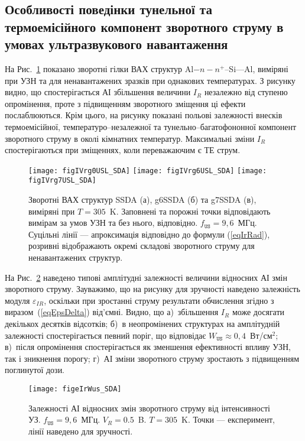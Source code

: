 \subsection{Особливості поведінки тунельної та термоемісійного компонент зворотного струму в умовах ультразвукового навантаження}

На Рис.~\ref{figIVrg0USL_SDA} показано зворотні гілки ВАХ структур Al$-n-n^+$--Si---Al, виміряні при УЗН та для ненавантажених
зразків при однакових температурах.
З рисунку видно, що спостерігається АІ збільшення величини $I_R$ незалежно від ступеню опромінення, проте з підвищенням зворотного
зміщення ці ефекти послаблюються.
Крім цього, на рисунку показані польові залежності внесків термоемісійної, температуро--незалежної та тунельно--багатофононної компонент
зворотного струму в околі кімнатних температур.
Максимальні зміни $I_R$ спостерігаються при зміщеннях, коли переважаючим є ТЕ струм.


\begin{figure}
\center
\texttt{[image: figIVrg0USL\_SDA]}
\texttt{[image: figIVrg6USL\_SDA]}
\texttt{[image: figIVrg7USL\_SDA]}
\caption{\label{figIVrg0USL_SDA}
Зворотні  ВАХ  структур SSDA (а), g6SSDA (б) та g7SSDA (в), виміряні при $T=305$~K.
Заповнені та порожні точки відповідають вимірам за умов УЗН та без нього, відповідно.
$f_\mathtt{US}=9,6$~МГц.
Суцільні лінії --- апроксимація відповідно до формули (\ref{eqIrRad}),
розривні відображають окремі складові зворотного струму для ненавантажених структур.
}%
\end{figure}



На Рис.~\ref{figeIrWus_SDA} наведено типові амплітудні залежності величини відносних АІ змін зворотного струму.
Зауважимо, що на рисунку для зручності наведено залежність модуля $\varepsilon_{IR}$, оскільки при зростанні струму результати обчислення згідно з виразом~(\ref{eqEpsDelta}) від'ємні.
Видно, що
а)~збільшення $I_R$ може досягати декількох десятків відсотків;
б)~в неопромінених структурах на амплітудній залежності спостерігається певний поріг, що відповідає $W_\mathtt{US}\approx0,4$~Вт/см$^2$;
в)~після опромінення спостерігається як зменшення ефективності впливу УЗН, так і зникнення порогу;
г)~АІ зміни зворотного струму зростають з підвищенням поглинутої дози.


\begin{figure}
\center
\texttt{[image: figeIrWus\_SDA]}
\caption{\label{figeIrWus_SDA}
Залежності АІ відносних змін зворотного струму від інтенсивності УЗ.
$f_\mathtt{US}=9,6$~МГц.
$V_R=0.5$~B. $T=305$~K.
Точки --- експеримент,
лінії наведено для зручності.
}%
\end{figure}

